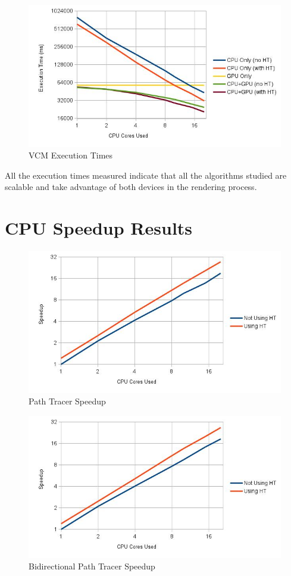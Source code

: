 \begin{figure}[H]
\includegraphics[width=\linewidth]{img/vcmTexec.jpg}
\caption{\label{img:vcmTexec} VCM Execution Times}
\end{figure}

All the execution times measured indicate that all the algorithms studied are scalable and take advantage of both devices in the rendering process.

\section{CPU Speedup Results}

\begin{figure}[H]
\includegraphics[width=\linewidth]{img/ptSpeedup.jpg}
\caption{\label{img:ptSpeedup} Path Tracer Speedup}
\end{figure}

\begin{figure}[H]
\includegraphics[width=\linewidth]{img/bptSpeedup.jpg}
\caption{\label{img:bptSpeedup} Bidirectional Path Tracer Speedup}
\end{figure}

